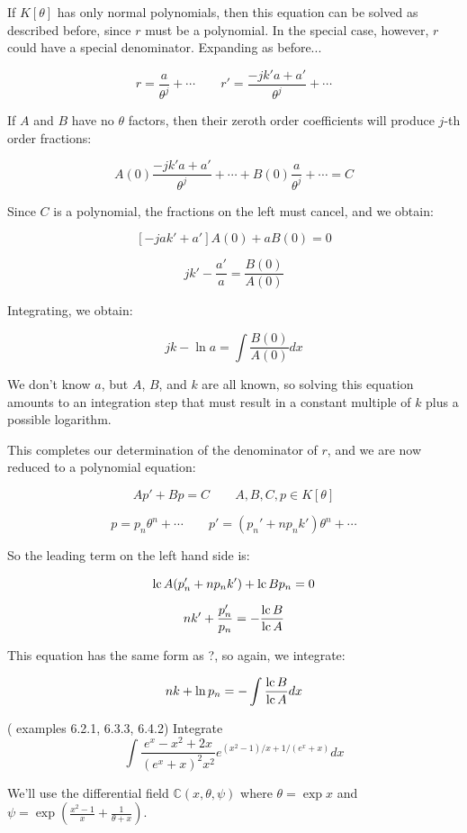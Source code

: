 If $K[\theta]$ has only normal polynomials, then this equation can be
solved as described before, since $r$ must be a polynomial.
In the special case, however, $r$ could have a special denominator.
Expanding as before...

$$r = \frac{a}{\theta^j} + \cdots  \qquad  r' = \frac{-j k' a + a'}{\theta^{j}} + \cdots$$

If $A$ and $B$ have no $\theta$ factors, then their zeroth order coefficients will produce $j$-th order fractions:

$$ A(0) \frac{-j k' a + a'}{\theta^{j}} + \cdots
+ B(0) \frac{a}{\theta^j} + \cdots  = C$$

Since $C$ is a polynomial, the fractions on the left must cancel, and we obtain:

$$\left[ -j a k' + a' \right] A(0) + a B(0) = 0$$


$$ jk' - \frac{a'}{a }  = \frac{B(0)}{A(0)}$$

Integrating, we obtain:

$$ jk - \ln a = \int \frac{B(0)}{A(0)} dx$$

We don't know $a$, but $A$, $B$, and $k$ are all known, so solving
this equation amounts to an integration step that must result in a
constant multiple of $k$ plus a possible logarithm.

This completes our determination of the denominator of $r$, and we
are now reduced to a polynomial equation:

$$A p' + B p = C \qquad A,B,C,p \in K[\theta]$$

$$p = p_n \theta^n + \cdots \qquad p' = (p_n' + n p_n k') \theta^n + \cdots$$

So the leading term on the left hand side is:

$${\rm lc\,} A (p_n' + n p_n k') + {\rm lc\,} B p_n = 0$$

$$n k' + \frac{p_n'}{p_n} = - \frac{{\rm lc\,} B}{{\rm lc\,} A}$$

This equation has the same form as ?, so again, we integrate:

$$n k + \ln p_n = - \int \frac{{\rm lc\,} B}{{\rm lc\,} A} dx$$

\vfill\eject

\example (\cite{bronstein book} examples 6.2.1, 6.3.3, 6.4.2) Integrate
$$\int \frac{e^x - x^2 + 2x}{(e^x + x)^2 x^2}e^{(x^2-1)/x+1/(e^x+x)} dx$$

We'll use the differential field ${\mathbb C}(x, \theta, \psi)$ where
$\theta = \exp x$ and $\psi = \exp\left( \frac{x^2-1}{x}+\frac{1}{\theta+x}\right)$.

